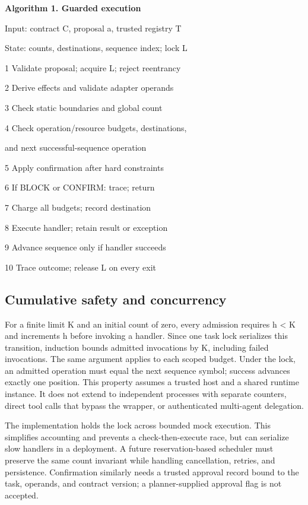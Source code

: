 \documentclass[conference,letterpaper]{IEEEtran}
\begin{document}
\begin{center}
\begin{minipage}{.98\columnwidth}
\small\textbf{Algorithm 1. Guarded execution}\par
Input: contract C, proposal a, trusted registry T\par
State: counts, destinations, sequence index; lock L\par
1  Validate proposal; acquire L; reject reentrancy\par
2  Derive effects and validate adapter operands\par
3  Check static boundaries and global count\par
4  Check operation/resource budgets, destinations,\par
     and next successful-sequence operation\par
5  Apply confirmation after hard constraints\par
6  If BLOCK or CONFIRM: trace; return\par
7  Charge all budgets; record destination\par
8  Execute handler; retain result or exception\par
9  Advance sequence only if handler succeeds\par
10 Trace outcome; release L on every exit\par
\end{minipage}
\end{center}


\subsection{Cumulative safety and concurrency}

For a finite limit K and an initial count of zero, every admission requires h \textless{} K and increments h before invoking a handler. Since one task lock serializes this transition, induction bounds admitted invocations by K, including failed invocations. The same argument applies to each scoped budget. Under the lock, an admitted operation must equal the next sequence symbol; success advances exactly one position. This property assumes a trusted host and a shared runtime instance. It does not extend to independent processes with separate counters, direct tool calls that bypass the wrapper, or authenticated multi-agent delegation.


The implementation holds the lock across bounded mock execution. This simplifies accounting and prevents a check-then-execute race, but can serialize slow handlers in a deployment. A future reservation-based scheduler must preserve the same count invariant while handling cancellation, retries, and persistence. Confirmation similarly needs a trusted approval record bound to the task, operands, and contract version; a planner-supplied approval flag is not accepted.
\end{document}
